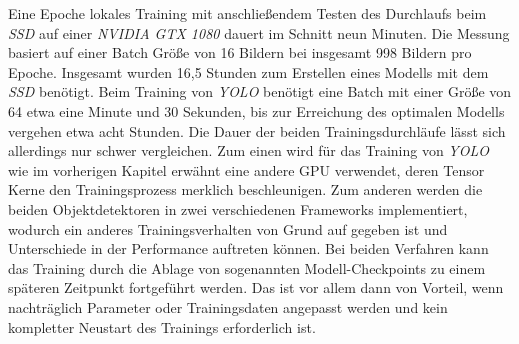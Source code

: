 Eine Epoche lokales Training mit anschließendem Testen des Durchlaufs beim \textit{SSD} auf einer \textit{NVIDIA GTX 1080} dauert im Schnitt neun Minuten. Die Messung basiert auf einer Batch Größe von 16 Bildern bei insgesamt 998 Bildern pro Epoche. Insgesamt wurden 16,5 Stunden zum Erstellen eines Modells mit dem \textit{SSD} benötigt. Beim Training von \textit{YOLO} benötigt eine Batch mit einer Größe von 64 etwa eine Minute und 30 Sekunden, bis zur Erreichung des optimalen Modells vergehen etwa acht Stunden. Die Dauer der beiden Trainingsdurchläufe lässt sich allerdings nur schwer vergleichen. Zum einen wird für das Training von \textit{YOLO} wie im vorherigen Kapitel erwähnt eine andere GPU verwendet, deren Tensor Kerne den Trainingsprozess merklich beschleunigen. Zum anderen werden die beiden Objektdetektoren in zwei verschiedenen Frameworks implementiert, wodurch ein anderes Trainingsverhalten von Grund auf gegeben ist und Unterschiede in der Performance auftreten können. Bei beiden Verfahren kann das Training durch die Ablage von sogenannten Modell-Checkpoints zu einem späteren Zeitpunkt fortgeführt werden. Das ist vor allem dann von Vorteil, wenn nachträglich Parameter oder Trainingsdaten angepasst werden und kein kompletter Neustart des Trainings erforderlich ist.


